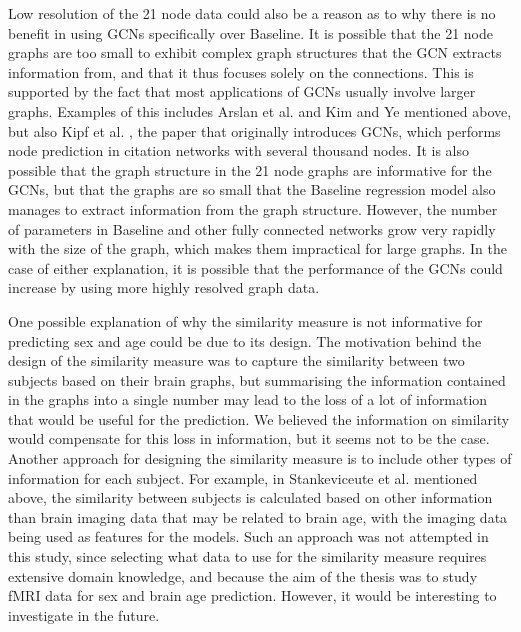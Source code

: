 Low resolution of the 21 node data could also be a reason as to why there is no benefit in using GCNs specifically over Baseline. It is possible that the 21 node graphs are too small to exhibit complex graph structures that the GCN extracts information from, and that it thus focuses solely on the connections. This is supported by the fact that most applications of GCNs usually involve larger graphs. Examples of this includes Arslan et al. and Kim and Ye mentioned above, but also Kipf et al. \cite{kipf_semi_supervised}, the paper that originally introduces GCNs, which performs node prediction in citation networks with several thousand nodes. It is also possible that the graph structure in the 21 node graphs are informative for the GCNs, but that the graphs are so small that the Baseline regression model also manages to extract information from the graph structure. However, the number of parameters in Baseline and other fully connected networks grow very rapidly with the size of the graph, which makes them impractical for large graphs. In the case of either explanation, it is possible that the performance of the GCNs could increase by using more highly resolved graph data.

One possible explanation of why the similarity measure is not informative for predicting sex and age could be due to its design. The motivation behind the design of the similarity measure was to capture the similarity between two subjects based on their brain graphs, but summarising the information contained in the graphs into a single number may lead to the loss of a lot of information that would be useful for the prediction. We believed the information on similarity would compensate for this loss in information, but it seems not to be the case. Another approach for designing the similarity measure is to include other types of information for each subject. For example, in Stankeviceute et al. mentioned above, the similarity between subjects is calculated based on other information than brain imaging data that may be related to brain age, with the imaging data being used as features for the models. Such an approach was not attempted in this study, since selecting what data to use for the similarity measure requires extensive domain knowledge, and because the aim of the thesis was to study fMRI data for sex and brain age prediction. However, it would be interesting to investigate in the future.


